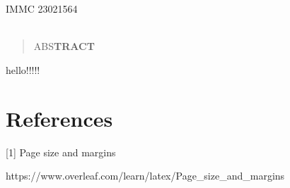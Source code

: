 \documentclass[12pt]{article}
\begin{document}
\newpage

\begin{center}
	\Huge
	~\\
	~\\
	IMMC 23021564
	~\\
	~\\
	\normalsize
\end{center}

\begin{abstract}
	ABS\textbf{TRACT}
\end{abstract}

\newpage
\tableofcontents
\newpage

hello!!!!!


\section{References}

[1] Page size and margins

https://www.overleaf.com/learn/latex/Page\_size\_and\_margins
\end{document}
